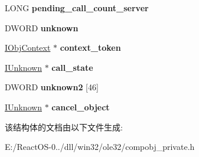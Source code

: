 \begin{DoxyCompactItemize}
\item 
\mbox{\label{structoletls_a60e615f7bbacdf1a79cdffea37955225}} 
L\+O\+NG {\bfseries pending\+\_\+call\+\_\+count\+\_\+server}
\item 
\mbox{\label{structoletls_a48570eca907ca5098f2e22d9318c26eb}} 
D\+W\+O\+RD {\bfseries unknown}
\item 
\mbox{\label{structoletls_a88cc3f7a5227ab0bc5430698d2460e49}} 
\hyperlink{interface_i_obj_context}{I\+Obj\+Context} $\ast$ {\bfseries context\+\_\+token}
\item 
\mbox{\label{structoletls_a52a3772b95dd33cff511855860054ccf}} 
\hyperlink{interface_i_unknown}{I\+Unknown} $\ast$ {\bfseries call\+\_\+state}
\item 
\mbox{\label{structoletls_a89df8c98ab1ce6dec33f27f272ebb960}} 
D\+W\+O\+RD {\bfseries unknown2} \mbox{[}46\mbox{]}
\item 
\mbox{\label{structoletls_a9a8d77316d0c4cccba9f5ef2b3a7552f}} 
\hyperlink{interface_i_unknown}{I\+Unknown} $\ast$ {\bfseries cancel\+\_\+object}
\end{DoxyCompactItemize}


该结构体的文档由以下文件生成\+:\begin{DoxyCompactItemize}
\item 
E\+:/\+React\+O\+S-\/0../dll/win32/ole32/compobj\+\_\+private.\+h\end{DoxyCompactItemize}
